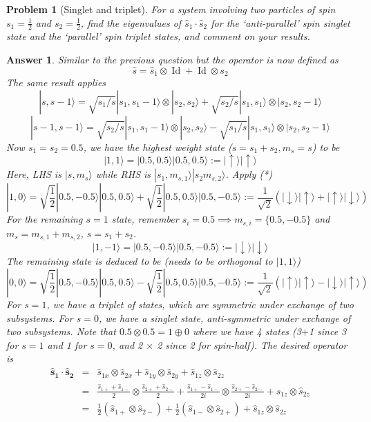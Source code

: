 \documentclass[a4paper]{article}
\DeclareMathOperator{\Id}{Id}
\newtheorem{ans}{Answer}[section]
\theoremstyle{new}
\newtheorem{qns}{Problem}[section]
\begin{document}
\newpage
\begin{qns}[Singlet and triplet]
For a system involving two particles of spin $s_1=\frac{1}{2}$ and $s_2=\frac{1}{2}$, find the eigenvalues of $\hat{s}_1\cdot\hat{s}_2$ for the `anti-parallel' spin singlet state and the `parallel' spin triplet states, and comment on your results.
\end{qns}
\begin{ans}
Similar to the previous question but the operator is now defined as
$$\hat{s}=\hat{s}_1\otimes\Id+\Id\otimes s_2$$
The same result applies
\begin{equation}
|s,s-1\rangle=\sqrt{s_1/s}|s_1,s_1-1\rangle\otimes|s_2,s_2\rangle+\sqrt{s_2/s}|s_1,s_1\rangle\otimes|s_2,s_2-1\rangle\tag{*}
\end{equation}
\begin{equation}
|s-1,s-1\rangle=\sqrt{s_2/s}|s_1,s_1-1\rangle\otimes|s_2,s_2\rangle-\sqrt{s_1/s}|s_1,s_1\rangle\otimes|s_2,s_2-1\rangle\tag{\dag}
\end{equation}
Now $s_1=s_2=0.5$, we have the highest weight state ($s=s_1+s_2,m_s=s$) to be $$|1,1\rangle=|0.5,0.5\rangle|0.5,0.5\rangle:=|\uparrow\rangle|\uparrow\rangle$$ 
Here, LHS is $|s,m_s\rangle$ while RHS is $|s_1,m_{s,1}\rangle|s_2m_{s,2}\rangle$. Apply (*) $$|1,0\rangle=\sqrt{\frac{1}{2}}|0.5,-0.5\rangle|0.5,0.5\rangle+\sqrt{\frac{1}{2}}|0.5,0.5\rangle|0.5,-0.5\rangle:=\frac{1}{\sqrt{2}}(|\downarrow\rangle|\uparrow\rangle+|\uparrow\rangle|\downarrow\rangle)$$
For the remaining $s=1$ state, remember $s_i=0.5\implies m_{s,i}=\{0.5,-0.5\}$ and $m_s=m_{s,1}+m_{s,2}$, $s=s_1+s_2$.
$$|1,-1\rangle=|0.5,-0.5\rangle|0.5,-0.5\rangle:=|\downarrow\rangle|\downarrow\rangle$$ 
The remaining state is deduced to be (needs to be orthogonal to $|1,1\rangle$)
$$|0,0\rangle=\sqrt{\frac{1}{2}}|0.5,-0.5\rangle|0.5,0.5\rangle-\sqrt{\frac{1}{2}}|0.5,0.5\rangle|0.5,-0.5\rangle:=\frac{1}{\sqrt{2}}(|\uparrow\rangle|\uparrow\rangle-|\downarrow\rangle|\uparrow\rangle)$$
For $s=1$, we have a triplet of states, which are symmetric under exchange of two subsystems. For $s=0$, we have a singlet state, anti-symmetric under exchange of two subsystems. Note that $0.5\otimes0.5=1\oplus0$ where we have 4 states (3$+$1 since 3 for $s=1$ and 1 for $s=0$, and 2 $\times$ 2 since 2 for spin-half). The desired operator is
\begin{eqnarray}
\mathbf{\hat{s}_1}\cdot\mathbf{\hat{s}_2}&=&\hat{s}_{1x}\otimes\hat{s}_{2x}+\hat{s}_{1y}\otimes\hat{s}_{2y}+\hat{s}_{1z}\otimes\hat{s}_{2z}\nonumber\\&=&\frac{\hat{s}_{1+}+\hat{s}_{1-}}{2}\otimes\frac{\hat{s}_{2+}+\hat{s}_{2-}}{2}+\frac{\hat{s}_{1+}-\hat{s}_{1-}}{2i}\otimes\frac{\hat{s}_{2+}-\hat{s}_{2-}}{2i}+\hat{s}_{1z} \otimes\hat{s}_{2z}\nonumber\\&=&\frac{1}{2}(\hat{s}_{1+}\otimes \hat{s}_{2-})+\frac{1}{2}(\hat{s}_{1-}\otimes\hat{s}_{2+})+\hat{s}_{1z}\otimes\hat{s}_{2z}\nonumber

\end{eqnarray}
\end{ans}
\end{document}
